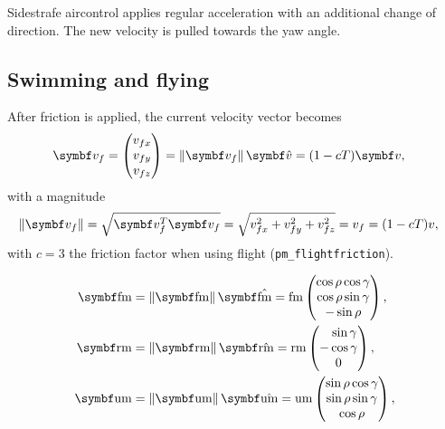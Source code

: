 Sidestrafe aircontrol applies regular acceleration with an additional change of direction. The new velocity is pulled towards the yaw angle.


\subsection{Swimming and flying}
After friction is applied, the current velocity vector becomes
\begin{align*}
\vec{v}_f &=
\begin{pmatrix}
v_{fx} \\ v_{fy} \\ v_{fz}
\end{pmatrix} = \norm{\vec{v}_f} \uvec{v} = (1-cT)\vec{v},
\end{align*}
with a magnitude
\begin{align*}
\norm{\vec{v}_f} &= \sqrt{\vec{v}_f^T \vec{v}_f} = \sqrt{v_{fx}^2 + v_{fy}^2 + v_{fz}^2} = v_f = (1-cT)v,
\end{align*}
with $c = 3$ the friction factor when using flight (\texttt{pm\_flightfriction}).

\begin{align*}
\vec{\fmove} &= \norm{\vec{\fmove}} \uvec{\fmove} = \fmove
\begin{pmatrix}
\cos\rho\cos\gamma \\ \cos\rho\sin\gamma \\ -\sin\rho
\end{pmatrix},\\
%
\vec{\rmove} &= \norm{\vec{\rmove}} \uvec{\rmove} = \rmove
\begin{pmatrix}
\hphantom{-}\sin\gamma \\ -\cos\gamma \\ 0
\end{pmatrix},\\
%
\vec{\umove} &= \norm{\vec{\umove}} \uvec{\umove} = \umove
\begin{pmatrix}
\sin\rho\cos\gamma \\ \sin\rho\sin\gamma \\ \cos\rho
\end{pmatrix},
\end{align*}

